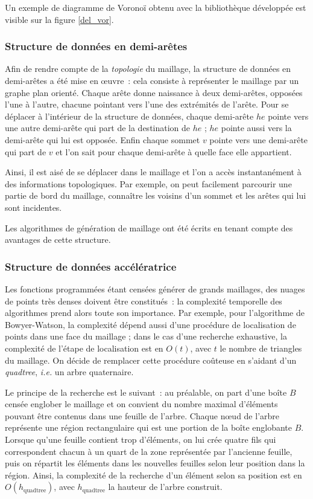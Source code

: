\documentclass[12pt,a4paper]{report}
\begin{document}
Un exemple de diagramme de Voronoï obtenu avec la bibliothèque développée est visible sur la figure \ref{del_vor}.


\subsubsection{Structure de données en demi-arêtes}

Afin de rendre compte de la \emph{topologie} du maillage, la structure de données en demi-arêtes a été mise en \oe{}uvre~: cela consiste à représenter le maillage par un graphe plan orienté. Chaque arête donne naissance à deux demi-arêtes, opposées l'une à l'autre, chacune pointant vers l'une des extrémités de l'arête. Pour se déplacer à l'intérieur de la structure de données, chaque demi-arête $he$ pointe vers une autre demi-arête qui part de la destination de $he$ ; $he$ pointe aussi vers la demi-arête qui lui est opposée. Enfin chaque sommet $v$ pointe vers une demi-arête qui part de $v$ et l'on sait pour chaque demi-arête à quelle face elle appartient.

Ainsi, il est aisé de se déplacer dans le maillage et l'on a accès instantanément à des informations topologiques. Par exemple, on peut facilement parcourir une partie de bord du maillage, connaître les voisins d'un sommet et les arêtes qui lui sont incidentes.

Les algorithmes de génération de maillage ont été écrits en tenant compte des avantages de cette structure.



\subsubsection{Structure de données accélératrice}

Les fonctions programmées étant censées générer de \og grands \fg{} maillages, des nuages de points très denses doivent être constitués~: la  complexité temporelle des algorithmes prend alors toute son importance. Par exemple, pour l'algorithme de Bowyer-Watson, la complexité dépend aussi d'une procédure de localisation de points dans une face du maillage ; dans le cas d'une recherche exhaustive, la complexité de l'étape de localisation est en $O(t)$, avec $t$ le nombre de triangles du maillage. On décide de remplacer cette procédure coûteuse en s'aidant d'un \emph{quadtree}, \emph{i.e.} un arbre quaternaire.

Le principe de la recherche est le suivant~: au préalable, on part d'une boîte $B$ censée englober le maillage et on convient du nombre maximal d'éléments pouvant être contenus dans une feuille de l'arbre. Chaque n\oe{}ud de l'arbre représente une région rectangulaire qui est une portion de la boîte englobante $B$. Lorsque qu'une feuille contient trop d'éléments, on lui crée quatre fils qui correspondent chacun à un quart de la zone représentée par l'ancienne feuille, puis on répartit les éléments dans les nouvelles feuilles selon leur position dans la région. Ainsi, la complexité de la recherche d'un élément selon sa position est en $O(h_{\text{quadtree}})$, avec $h_{\text{quadtree}}$ la hauteur de l'arbre construit.
\end{document}
